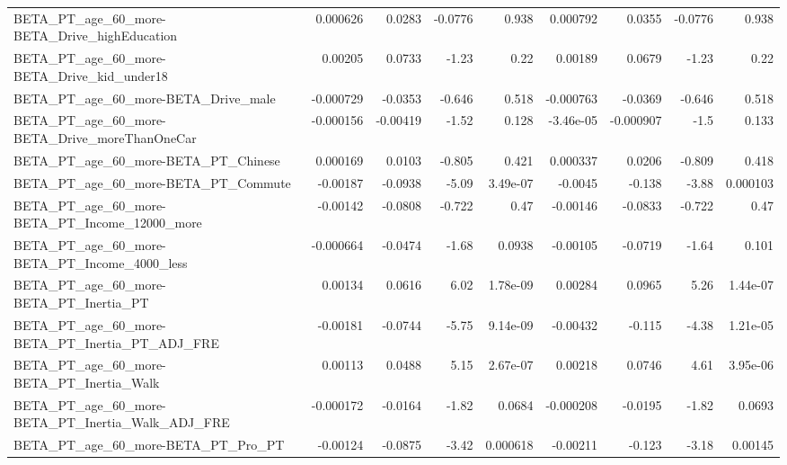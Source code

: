 \begin{tabular}{lrrrrrrrr}
BETA\_PT\_age\_60\_more-BETA\_Drive\_highEducation       &    0.000626 &       0.0283 &  -0.0776 &    0.938 &   0.000792 &      0.0355 &      -0.0776 &         0.938 \\
BETA\_PT\_age\_60\_more-BETA\_Drive\_kid\_under18         &     0.00205 &       0.0733 &    -1.23 &     0.22 &    0.00189 &      0.0679 &        -1.23 &          0.22 \\
BETA\_PT\_age\_60\_more-BETA\_Drive\_male                &   -0.000729 &      -0.0353 &   -0.646 &    0.518 &  -0.000763 &     -0.0369 &       -0.646 &         0.518 \\
BETA\_PT\_age\_60\_more-BETA\_Drive\_moreThanOneCar      &   -0.000156 &     -0.00419 &    -1.52 &    0.128 &  -3.46e-05 &   -0.000907 &         -1.5 &         0.133 \\
BETA\_PT\_age\_60\_more-BETA\_PT\_Chinese                &    0.000169 &       0.0103 &   -0.805 &    0.421 &   0.000337 &      0.0206 &       -0.809 &         0.418 \\
BETA\_PT\_age\_60\_more-BETA\_PT\_Commute                &    -0.00187 &      -0.0938 &    -5.09 & 3.49e-07 &    -0.0045 &      -0.138 &        -3.88 &      0.000103 \\
BETA\_PT\_age\_60\_more-BETA\_PT\_Income\_12000\_more      &    -0.00142 &      -0.0808 &   -0.722 &     0.47 &   -0.00146 &     -0.0833 &       -0.722 &          0.47 \\
BETA\_PT\_age\_60\_more-BETA\_PT\_Income\_4000\_less       &   -0.000664 &      -0.0474 &    -1.68 &   0.0938 &   -0.00105 &     -0.0719 &        -1.64 &         0.101 \\
BETA\_PT\_age\_60\_more-BETA\_PT\_Inertia\_PT             &     0.00134 &       0.0616 &     6.02 & 1.78e-09 &    0.00284 &      0.0965 &         5.26 &      1.44e-07 \\
BETA\_PT\_age\_60\_more-BETA\_PT\_Inertia\_PT\_ADJ\_FRE     &    -0.00181 &      -0.0744 &    -5.75 & 9.14e-09 &   -0.00432 &      -0.115 &        -4.38 &      1.21e-05 \\
BETA\_PT\_age\_60\_more-BETA\_PT\_Inertia\_Walk           &     0.00113 &       0.0488 &     5.15 & 2.67e-07 &    0.00218 &      0.0746 &         4.61 &      3.95e-06 \\
BETA\_PT\_age\_60\_more-BETA\_PT\_Inertia\_Walk\_ADJ\_FRE   &   -0.000172 &      -0.0164 &    -1.82 &   0.0684 &  -0.000208 &     -0.0195 &        -1.82 &        0.0693 \\
BETA\_PT\_age\_60\_more-BETA\_PT\_Pro\_PT                 &    -0.00124 &      -0.0875 &    -3.42 & 0.000618 &   -0.00211 &      -0.123 &        -3.18 &       0.00145 \\

\end{tabular}
